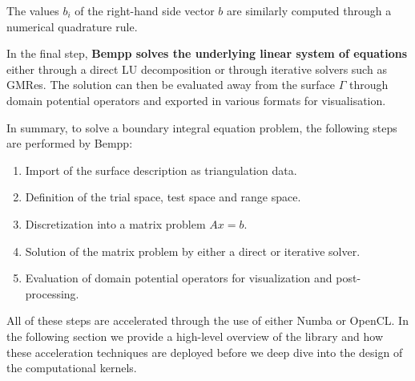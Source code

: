 The values $b_i$ of the right-hand side vector $b$ are similarly computed through a numerical quadrature rule.

In the final step, \textbf{Bempp solves the underlying linear system of equations} either through a direct LU decomposition or through iterative solvers such as GMRes. The solution can then be evaluated away from the surface $\Gamma$ through domain potential operators and exported in various formats for visualisation.

In summary, to solve a boundary integral equation problem, the following steps are performed by Bempp:
\begin{enumerate}
	\item Import of the surface description as triangulation data.
	\item Definition of the trial space, test space and range space.
	\item Discretization into a matrix problem $Ax=b$.
	\item Solution of the matrix problem by either a direct or iterative solver.
	\item Evaluation of domain potential operators for visualization and post-processing.
\end{enumerate}

All of these steps are accelerated through the use of either Numba or OpenCL. In the following section we provide a high-level overview of the library and how these acceleration techniques are deployed before we deep dive into the design of the computational kernels.